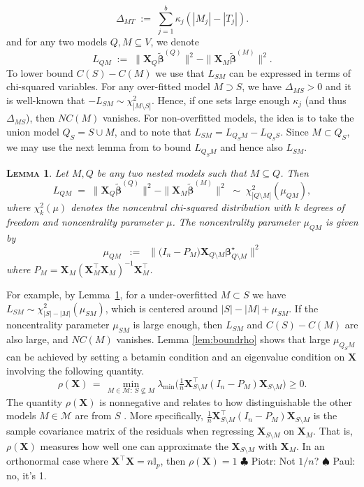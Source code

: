 \documentclass[aos]{imsart}
\theoremstyle{plain}
\newtheorem{lem}[thm]{\textsc{Lemma}}
\newcommand{\piotr}[1]{{\small{\color{red} \sf $\clubsuit$ Piotr: #1}}}
\newcommand{\paul}[1]{{\small{\color{green} \sf $\spadesuit$ Paul: #1}}}
\newcommand{\I}{\mathbb{I}}
\newcommand{\M}{\mathcal{M}}
\newcommand{\bs}{\boldsymbol}
\begin{document}
\begin{equation}\label{eq:DeltaM}
\Delta_{MT}\;:=\;\sum_{j=1}^b \kappa_j(|M_j|-|T_j|). 
\end{equation}
and for any two models $Q,M\subseteq V$, we denote 
$$L_{QM}\;:=\;\|\bs X_{Q}\tilde{\bs\beta}^{(Q)}\|^2-\|\bs X_{M}\tilde{\bs\beta}^{(M)}\|^2.$$
To lower bound $C(S)-C(M)$ we use that $L_{SM}$ can be expressed in terms of chi-squared variables.
For any over-fitted model $M \supset S$, we have $\Delta_{MS}>0$ and it is well-known that $-L_{SM} \sim \chi_{|M \setminus S|}^2$. Hence, if one sets large enough $\kappa_j$ (and thus $\Delta_{MS}$), then $NC(M)$ vanishes. 
For non-overfitted  models, the idea is to take the union model $Q_S=S\cup M$, and to note that $L_{SM}=L_{Q_SM}-L_{Q_SS}$. Since $M \subset Q_S$, we may use the next lemma from \cite{rossell2022concentration} to bound $L_{Q_SM}$ and hence also $L_{SM}$.

\begin{lem}\label{lemma:s7}
    Let $M,Q$ be any two nested models such that $M \subseteq Q$. Then
$$
L_{QM}\;=\;\|\bs X_{Q}\tilde{\bs\beta}^{(Q)}\|^2-\|\bs X_{M}\tilde{\bs\beta}^{(M)}\|^2\;\sim\; \chi_{|Q\setminus M|}^2\left(\mu_{Q M}\right), 
$$
where $\chi_{k}^2(\mu)$ denotes the noncentral chi-squared distribution with $k$ degrees of freedom and noncentrality parameter $\mu$. The noncentrality parameter $\mu_{QM}$ is given by \begin{equation}\label{eq:muQM}
    \mu_{QM}\;\;:=\;\;\|\big(I_n-P_M\big) \bs X_{Q\setminus M} \bs \beta^{\star}_{Q\setminus M}\|^2
\end{equation}
where $P_M=\bs X_{M}\left(\bs X_{M}^{\top} \bs X_{M}\right)^{-1} \bs X_{M}^{\top}$.
\end{lem}

For example, by Lemma~\ref{lemma:s7}, for a under-overfitted $M\subset S$ we have $L_{SM}\sim \chi^2_{|S|-|M|}(\mu_{SM})$, which is centered around $|S|-|M|+\mu_{SM}$.
If the noncentrality parameter $\mu_{SM}$ is large enough, then $L_{SM}$ and $C(S)-C(M)$ are also large, and $NC(M)$ vanishes. Lemma \ref{lem:boundrho} shows that large $\mu_{Q_SM}$ can be achieved by setting a betamin condition and an eigenvalue condition on $\bs X$ involving the following quantity.  
 \begin{equation}\label{eq:rhoX}
        \rho(\bs X)\,=\,\min_{M \in \M:\, S \not \subseteq M} \lambda_{\min}\big(\tfrac{1}{n} \boldsymbol{X}_{S \setminus M}^{\top}\left(I_n- P_M\right) \boldsymbol{X}_{S \setminus M}\big) \geq 0.
    \end{equation}
The quantity $\rho(\bs X)$ is nonnegative and relates to how distinguishable the other models $M\in \M$ are from $S$ \citep{infotheowainwright}.  More specifically, $\tfrac{1}{n} \boldsymbol{X}_{S \setminus M}^{\top}\left(I_n- P_M\right) \boldsymbol{X}_{S \setminus M}$ is the sample covariance matrix of the residuals when regressing $\boldsymbol{X}_{S \setminus M}$ on $\boldsymbol{X}_M$.
That is, $\rho(\bs X)$ measures how well one can approximate the 
$\boldsymbol{X}_{S \setminus M}$ with $\boldsymbol{X}_M$.
In an orthonormal case where $\bs X^{\top}\bs X=n\I_p$, then $\rho(\bs X)=1$\piotr{Not $1/n$?}\paul{no, it's 1}.  
\end{document}
